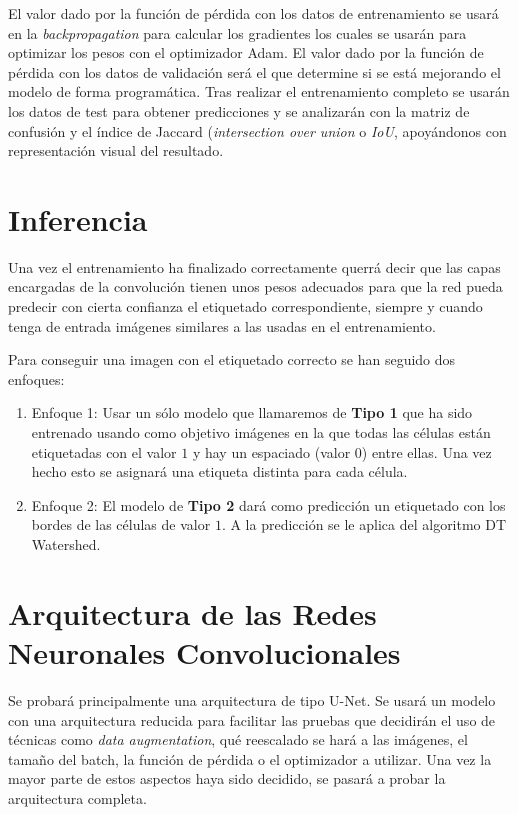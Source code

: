 El valor dado por la función de pérdida con los datos de entrenamiento se usará en la \textit{backpropagation} para calcular los gradientes los cuales se usarán para optimizar los pesos con el optimizador Adam. El valor dado por la función de pérdida con los datos de validación será el que determine si se está mejorando el modelo de forma programática. Tras realizar el entrenamiento completo  se usarán los datos de test para obtener predicciones y se analizarán con la matriz de confusión y el índice de Jaccard (\textit{intersection over union} o \textit{IoU}, apoyándonos con representación visual del resultado.

\pagebreak \section{Inferencia}\label{sec:inferencia}


Una vez el entrenamiento ha finalizado correctamente querrá decir que las capas encargadas de la convolución tienen unos pesos adecuados para que la red pueda predecir con cierta confianza el etiquetado correspondiente, siempre y cuando tenga de entrada imágenes similares a las usadas en el entrenamiento.

Para conseguir una imagen con el etiquetado correcto se han seguido dos enfoques:
\begin{enumerate}
\item Enfoque 1: Usar un sólo modelo que llamaremos de \textbf{Tipo 1} que ha sido entrenado usando como objetivo imágenes en la que todas las células están etiquetadas con el valor $ 1 $ y hay un espaciado (valor $ 0 $) entre ellas. Una vez hecho esto se asignará una etiqueta distinta para cada célula.
\item Enfoque 2: El modelo de \textbf{Tipo 2} dará como predicción un etiquetado con los bordes de las células de valor $ 1 $. A la predicción se le aplica del algoritmo DT Watershed.
\end{enumerate}

\pagebreak \section{Arquitectura de las Redes Neuronales Convolucionales}\label{sec:cnn_arch}

Se probará principalmente una arquitectura de tipo U-Net. Se usará un modelo con una arquitectura reducida para facilitar las pruebas que decidirán el uso de técnicas como \textit{data augmentation}, qué reescalado se hará a las imágenes, el tamaño del batch, la función de pérdida o el optimizador a utilizar. Una vez la mayor parte de estos aspectos haya sido decidido, se pasará a probar la arquitectura completa.